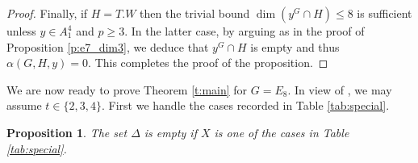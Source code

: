 \documentclass[twoside,a4paper,reqno,11pt]{amsart}
\renewcommand{\a}{\alpha}
\newcommand{\<}{\langle}
\renewcommand{\>}{\rangle}
\newcommand{\leqs}{\leqslant}
\newcommand{\geqs}{\geqslant}
\renewcommand{\:}{\colon}
\theoremstyle{plain}
\newtheorem{prop}[thm]{Proposition}
\theoremstyle{definition}
\begin{document}
\begin{proof}
Finally, if $H = T.W$ then the trivial bound $\dim (y^G \cap H) \leqs 8$ is sufficient unless $y \in A_1^4$ and $p \geqs 3$. In the latter case, by arguing as in the proof of Proposition \ref{p:e7_dim3}, we deduce that $y^G \cap H$ is empty and thus $\a(G,H,y) = 0$. This completes the proof of the proposition.
\end{proof}

We are now ready to prove Theorem \ref{t:main} for $G = E_8$. In view of \cite[Theorem 7]{BGG1}, we may assume $t \in \{2,3,4\}$. First we handle the cases recorded in Table \ref{tab:special}.

\begin{prop}\label{p:e8_00}
The set $\Delta$ is empty if $X$ is one of the cases in Table \ref{tab:special}.
\end{prop}
\end{document}
